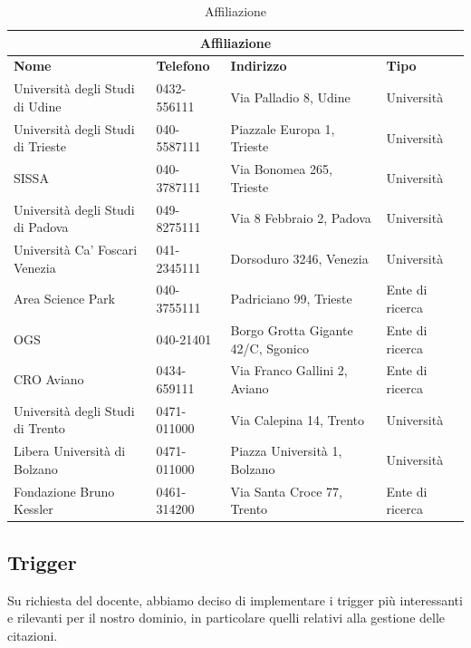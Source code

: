 \documentclass[a4paper,12pt]{article}
\begin{document}
\begin{table}[H]
\centering
\caption{Affiliazione}
\small
\begin{tabular}{llll}
\toprule
\multicolumn{4}{c}{\textbf{Affiliazione}} \\
\midrule
\textbf{Nome} & \textbf{Telefono} & \textbf{Indirizzo} & \textbf{Tipo} \\
\midrule
Università degli Studi di Udine   & 0432-556111 & Via Palladio 8, Udine              & Università      \\
Università degli Studi di Trieste & 040-5587111 & Piazzale Europa 1, Trieste         & Università      \\
SISSA                             & 040-3787111 & Via Bonomea 265, Trieste           & Università      \\
Università degli Studi di Padova  & 049-8275111 & Via 8 Febbraio 2, Padova           & Università      \\
Università Ca' Foscari Venezia    & 041-2345111 & Dorsoduro 3246, Venezia            & Università      \\
Area Science Park                 & 040-3755111 & Padriciano 99, Trieste             & Ente di ricerca \\
OGS                               & 040-21401   & Borgo Grotta Gigante 42/C, Sgonico & Ente di ricerca \\
CRO Aviano                        & 0434-659111 & Via Franco Gallini 2, Aviano       & Ente di ricerca \\
Università degli Studi di Trento  & 0471-011000 & Via Calepina 14, Trento            & Università      \\
Libera Università di Bolzano      & 0471-011000 & Piazza Università 1, Bolzano       & Università  \\
Fondazione Bruno Kessler          & 0461-314200 & Via Santa Croce 77, Trento       & Ente di ricerca \\
\bottomrule
\end{tabular}
\end{table}


\subsection{Trigger} \label{subsec:trigger-citazioni}
Su richiesta del docente, abbiamo deciso di implementare i trigger più interessanti e rilevanti per il nostro dominio, in particolare quelli relativi alla gestione delle citazioni. 
\end{document}
